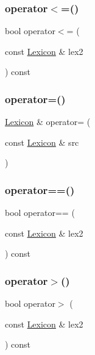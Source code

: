 \subsubsection{\texorpdfstring{operator$<$=()}{operator<=()}}
{\footnotesize\ttfamily bool operator$<$= (\begin{DoxyParamCaption}\item[{const \mbox{\hyperlink{classLexicon}{Lexicon}} \&}]{lex2 }\end{DoxyParamCaption}) const}

\mbox{\label{classLexicon_ab9766b3af1f48ed51a1bcf037e08de43}} 
\subsubsection{\texorpdfstring{operator=()}{operator=()}}
{\footnotesize\ttfamily \mbox{\hyperlink{classLexicon}{Lexicon}} \& operator= (\begin{DoxyParamCaption}\item[{const \mbox{\hyperlink{classLexicon}{Lexicon}} \&}]{src }\end{DoxyParamCaption})}

\mbox{\label{classLexicon_a4fcab616682564bf55eb0b096a35219d}} 
\subsubsection{\texorpdfstring{operator==()}{operator==()}}
{\footnotesize\ttfamily bool operator== (\begin{DoxyParamCaption}\item[{const \mbox{\hyperlink{classLexicon}{Lexicon}} \&}]{lex2 }\end{DoxyParamCaption}) const}

\mbox{\label{classLexicon_a04139ff41f8d25adbf5958ff2b01b068}} 
\subsubsection{\texorpdfstring{operator$>$()}{operator>()}}
{\footnotesize\ttfamily bool operator$>$ (\begin{DoxyParamCaption}\item[{const \mbox{\hyperlink{classLexicon}{Lexicon}} \&}]{lex2 }\end{DoxyParamCaption}) const}

